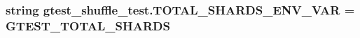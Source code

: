 \subsubsection[{\texorpdfstring{T\+O\+T\+A\+L\+\_\+\+S\+H\+A\+R\+D\+S\+\_\+\+E\+N\+V\+\_\+\+V\+AR}{TOTAL_SHARDS_ENV_VAR}}]{\setlength{\rightskip}{0pt plus 5cm}string gtest\+\_\+shuffle\+\_\+test.\+T\+O\+T\+A\+L\+\_\+\+S\+H\+A\+R\+D\+S\+\_\+\+E\+N\+V\+\_\+\+V\+AR = \textquotesingle{}G\+T\+E\+S\+T\+\_\+\+T\+O\+T\+A\+L\+\_\+\+S\+H\+A\+R\+DS\textquotesingle{}}\hypertarget{namespacegtest__shuffle__test_a29088c2bb51a4550fa2a668d972f973a}{}\label{namespacegtest__shuffle__test_a29088c2bb51a4550fa2a668d972f973a}
